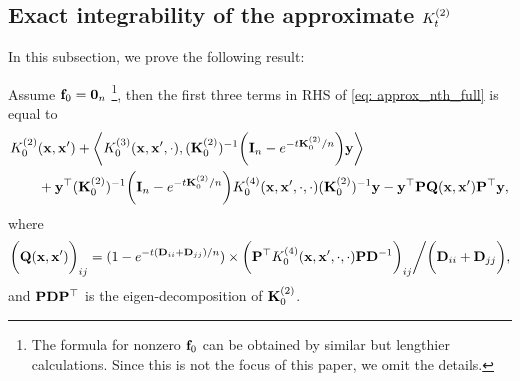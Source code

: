 \subsection{Exact integrability of the approximate \texorpdfstring{${K}^{(2)}_t$}{K2t}} \label{subappend:proof_approx_nth_zero_init}
In this subsection, we prove the following result:
\begin{proposition}
	\label{prop: approx_nth_zero_init}
	Assume ${\mathbf{f}}_0 = \mathbf{0}_n$ \footnote{The formula for nonzero ${\mathbf{f}}_0$ can be obtained by similar but lengthier calculations. Since this is not the focus of this paper,  we omit the details.}, then the first three terms in RHS of \eqref{eq: approx_nth_full} is equal to
	\begin{align*}
		 & {K}^{(2)}_0({\mathbf{x}}, {\mathbf{x}}') + \bigg\langle {K}^{(3)}_0({\mathbf{x}}, {\mathbf{x}}', \cdot), ({{\mathbf{K}}}^{(2)}_0)^{-1}\bigg({\mathbf{I}}_n - e^{-t {{\mathbf{K}}}^{(2)}_0/n}\bigg) {\mathbf{y}} \bigg\rangle  \\
		 & \qquad + {\mathbf{y}}^\top ({{\mathbf{K}}}^{(2)}_0)^{-1}\bigg({\mathbf{I}}_n - e^{-t {{\mathbf{K}}}^{(2)}_0/n}\bigg) {K}^{(4)}_0({\mathbf{x}}, {\mathbf{x}}', \cdot, \cdot) ({{\mathbf{K}}}^{(2)}_0)^{-1} {\mathbf{y}} - {\mathbf{y}}^\top {\mathbf{P}}{\mathbf{Q}}({\mathbf{x}}, {\mathbf{x}}'){\mathbf{P}}^\top {\mathbf{y}},
	\end{align*}
	where
	\begin{align*}
		\bigg({\mathbf{Q}}({\mathbf{x}}, {\mathbf{x}}')\bigg)_{ij} = (1-e^{-t({\mathbf{D}}_{ii} + {\mathbf{D}}_{jj})/n}) \times {\bigg({\mathbf{P}}^\top {K}^{(4)}_0({\mathbf{x}}, {\mathbf{x}}', \cdot, \cdot) {\mathbf{P}}{\mathbf{D}}^{-1}\bigg)_{ij}}\bigg/\bigg({{\mathbf{D}}_{ii} + {\mathbf{D}}_{jj}}\bigg)  ,
	\end{align*}
	and ${\mathbf{P}} {\mathbf{D}} {\mathbf{P}}^\top$ is the eigen-decomposition of ${{\mathbf{K}}}^{(2)}_0$.
\end{proposition}
